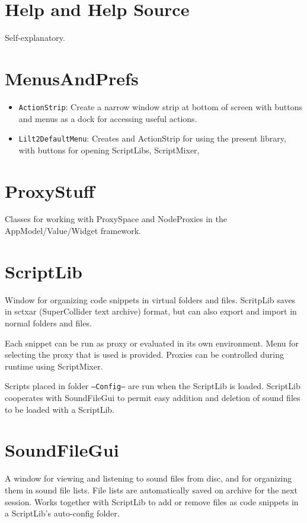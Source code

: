 \documentclass[11pt, a4paper]{scrartcl}
\begin{document}
\section{Help and Help Source}
\label{sec-4}


Self-explanatory. 
\section{MenusAndPrefs}
\label{sec-5}


\begin{itemize}
\item \texttt{ActionStrip}: Create a narrow window strip at bottom of screen with buttons and menus as a dock for accessing useful actions.
\item \texttt{Lilt2DefaultMenu}: Creates and ActionStrip for using the present library, with buttons for opening ScriptLibs, ScriptMixer,
\end{itemize}
\section{ProxyStuff}
\label{sec-6}


Classes for working with ProxySpace and NodeProxies in the AppModel/Value/Widget framework.
\section{ScriptLib}
\label{sec-7}


Window for organizing code snippets in virtual folders and files. ScritpLib saves in sctxar (SuperCollider text archive) format, but can also export and import in normal folders and files. 

Each snippet can be run as proxy or evaluated in its own environment. Menu for selecting the proxy that is used is provided. Proxies can be controlled during runtime using ScriptMixer. 

Scripts placed in folder \texttt{---Config---} are run when the ScriptLib is loaded.  ScriptLib cooperates with SoundFileGui to permit easy addition and deletion of sound files to be loaded with a ScriptLib. 
\section{SoundFileGui}
\label{sec-8}


A window for viewing and listening to sound files from disc, and for organizing them in sound file lists. File lists are automatically saved on archive for the next session. Works together with ScriptLib to add or remove files as code snippets in a ScriptLib's auto-config folder. 
\end{document}
